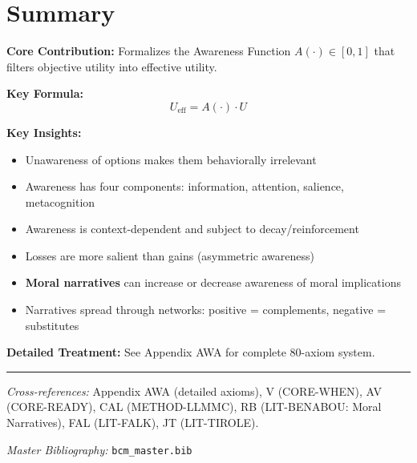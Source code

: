 \section{Summary}

\begin{tcolorbox}[colback=gray!5!white, colframe=gray!75!black,
    title=Appendix AU Summary: CORE-AWARE]

\textbf{Core Contribution:}
Formalizes the Awareness Function $A(\cdot) \in [0, 1]$ that filters objective
utility into effective utility.

\textbf{Key Formula:}
\begin{equation}
U_{\text{eff}} = A(\cdot) \cdot U
\end{equation}

\textbf{Key Insights:}
\begin{itemize}[nosep]
\item Unawareness of options makes them behaviorally irrelevant
\item Awareness has four components: information, attention, salience, metacognition
\item Awareness is context-dependent and subject to decay/reinforcement
\item Losses are more salient than gains (asymmetric awareness)
\item \textbf{Moral narratives} can increase or decrease awareness of moral implications
\item Narratives spread through networks: positive = complements, negative = substitutes
\end{itemize}

\textbf{Detailed Treatment:} See Appendix AWA for complete 80-axiom system.

\end{tcolorbox}

\vspace{1em}
\hrule
\vspace{0.5em}

\noindent\textit{Cross-references:}
Appendix AWA (detailed axioms), V (CORE-WHEN), AV (CORE-READY), CAL (METHOD-LLMMC), RB (LIT-BENABOU: Moral Narratives), FAL (LIT-FALK), JT (LIT-TIROLE).

\noindent\textit{Master Bibliography:} \texttt{bcm\_master.bib}

\nocite{bcm_master}

